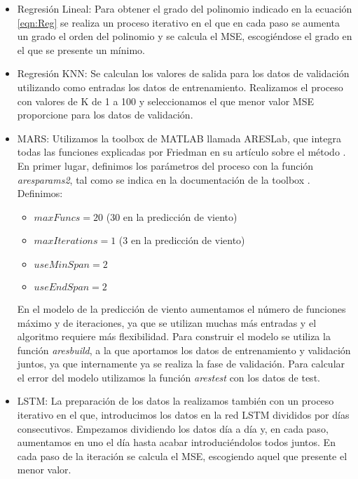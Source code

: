 \documentclass[journal]{IEEEtran}
\begin{document}
\begin{itemize}
    \item Regresión Lineal: Para obtener el grado del polinomio indicado en la ecuación \ref{eqn:Reg} se realiza un proceso iterativo en el que en cada paso se aumenta un grado el orden del polinomio y se calcula el MSE, escogiéndose el grado en el que se presente un mínimo. 

    \item Regresión KNN: Se calculan los valores de salida para los datos de validación utilizando como entradas los datos de entrenamiento. Realizamos el proceso con valores de K de 1 a 100 y seleccionamos el que menor valor MSE proporcione para los datos de validación.
    \item MARS: Utilizamos la toolbox de MATLAB llamada ARESLab, que integra todas las funciones explicadas por Friedman en su artículo sobre el método \cite{JHFRIEDMAN1991}. En primer lugar, definimos los parámetros del proceso con la función \emph{aresparams2}, tal como se indica en la documentación de la toolbox \cite{ARESLAB2016}. Definimos:
    \begin{itemize}
        \item $maxFuncs = 20$ ($30$ en la predicción de viento)
        \item $maxIterations = 1$ ($3$ en la predicción de viento)
        \item $useMinSpan = 2$
        \item $useEndSpan = 2$
    \end{itemize}
    En el modelo de la predicción de viento aumentamos el número de funciones máximo y de iteraciones, ya que se utilizan muchas más entradas y el algoritmo requiere más flexibilidad.
    Para construir el modelo se utiliza la función \emph{aresbuild}, a la que aportamos los datos de entrenamiento y validación juntos, ya que internamente ya se realiza la fase de validación.
    Para calcular el error del modelo utilizamos la función \emph{arestest} con los datos de test.
    \item LSTM: La preparación de los datos la realizamos también con un proceso iterativo en el que, introducimos los datos en la red LSTM divididos por días consecutivos. Empezamos dividiendo los datos día a día y, en cada paso, aumentamos en uno el día hasta acabar introduciéndolos todos juntos. En cada paso de la iteración  se calcula el MSE, escogiendo aquel que presente el menor valor.

\end{itemize}
\end{document}
